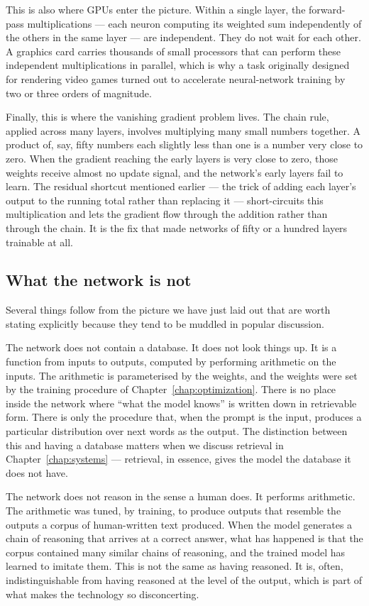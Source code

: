 This is also where GPUs enter the picture. Within a single
layer, the forward-pass multiplications --- each neuron
computing its weighted sum independently of the others in the
same layer --- are independent. They do not wait for each
other. A graphics card carries thousands of small processors
that can perform these independent multiplications in parallel,
which is why a task originally designed for rendering video
games turned out to accelerate neural-network training by two
or three orders of magnitude.

Finally, this is where the vanishing gradient problem lives.
The chain rule, applied across many layers, involves
multiplying many small numbers together. A product of, say,
fifty numbers each slightly less than one is a number very
close to zero. When the gradient reaching the early layers is
very close to zero, those weights receive almost no update
signal, and the network's early layers fail to learn. The
residual shortcut mentioned earlier --- the trick of adding
each layer's output to the running total rather than replacing
it --- short-circuits this multiplication and lets the gradient
flow through the addition rather than through the chain.
It is the fix that made networks of fifty or a hundred layers
trainable at all.

\subsection*{What the network is not}

Several things follow from the picture we have just laid out
that are worth stating explicitly because they tend to be
muddled in popular discussion.

The network does not contain a database. It does not look
things up. It is a function from inputs to outputs, computed by
performing arithmetic on the inputs. The arithmetic is
parameterised by the weights, and the weights were set by the
training procedure of Chapter~\ref{chap:optimization}. There is no place inside the
network where ``what the model knows'' is written down in
retrievable form. There is only the procedure that, when the
prompt is the input, produces a particular distribution over
next words as the output. The distinction between this and
having a database matters when we discuss retrieval in
Chapter~\ref{chap:systems} --- retrieval, in essence, gives the model the
database it does not have.

The network does not reason in the sense a human does. It
performs arithmetic. The arithmetic was tuned, by training,
to produce outputs that resemble the outputs a corpus of
human-written text produced. When the model generates a
chain of reasoning that arrives at a correct answer, what has
happened is that the corpus contained many similar chains of
reasoning, and the trained model has learned to imitate them.
This is not the same as having reasoned. It is, often,
indistinguishable from having reasoned at the level of the
output, which is part of what makes the technology so
disconcerting.

